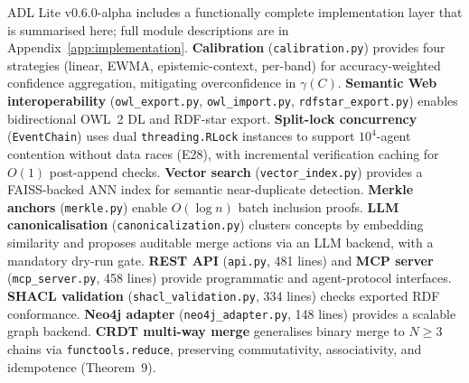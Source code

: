 ADL Lite v0.6.0-alpha includes a functionally complete implementation layer that is summarised here; full module descriptions are in Appendix~\ref{app:implementation}. \textbf{Calibration} (\texttt{calibration.py}) provides four strategies (linear, EWMA, epistemic-context, per-band) for accuracy-weighted confidence aggregation, mitigating overconfidence in $\gamma(C)$. \textbf{Semantic Web interoperability} (\texttt{owl\_export.py}, \texttt{owl\_import.py}, \texttt{rdfstar\_export.py}) enables bidirectional OWL~2 DL and RDF-star export. \textbf{Split-lock concurrency} (\texttt{EventChain}) uses dual \texttt{threading.RLock} instances to support $10^{4}$-agent contention without data races (E28), with incremental verification caching for $O(1)$ post-append checks. \textbf{Vector search} (\texttt{vector\_index.py}) provides a FAISS-backed ANN index for semantic near-duplicate detection. \textbf{Merkle anchors} (\texttt{merkle.py}) enable $O(\log n)$ batch inclusion proofs. \textbf{LLM canonicalisation} (\texttt{canonicalization.py}) clusters concepts by embedding similarity and proposes auditable merge actions via an LLM backend, with a mandatory dry-run gate. \textbf{REST API} (\texttt{api.py}, 481 lines) and \textbf{MCP server} (\texttt{mcp\_server.py}, 458 lines) provide programmatic and agent-protocol interfaces. \textbf{SHACL validation} (\texttt{shacl\_validation.py}, 334 lines) checks exported RDF conformance. \textbf{Neo4j adapter} (\texttt{neo4j\_adapter.py}, 148 lines) provides a scalable graph backend. \textbf{CRDT multi-way merge} generalises binary merge to $N\geq3$ chains via \texttt{functools.reduce}, preserving commutativity, associativity, and idempotence (Theorem~9).
